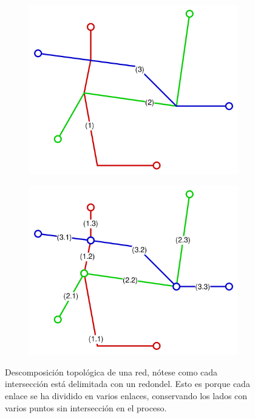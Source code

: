 	\begin{figure}[htbp]
		\begin{center}
	\begin{subfigure}{0.4\textwidth}
		\centering
		\includegraphics[width=.95\textwidth]{img/topology_before.png}
		\label{topology_before}
	\end{subfigure}
	\begin{subfigure}{0.4\textwidth}
		\centering
		\includegraphics[width=.95\textwidth]{img/topology_after.png}
		\label{topology_after}
	\end{subfigure}
\end{center}
	\caption[Descomposición topológica de una red]{Descomposición topológica de una red, nótese como cada intersección está delimitada con un redondel. Esto es porque cada enlace se ha dividido en varios enlaces, conservando los lados con varios puntos sin intersección en el proceso.}
	\end{figure}

